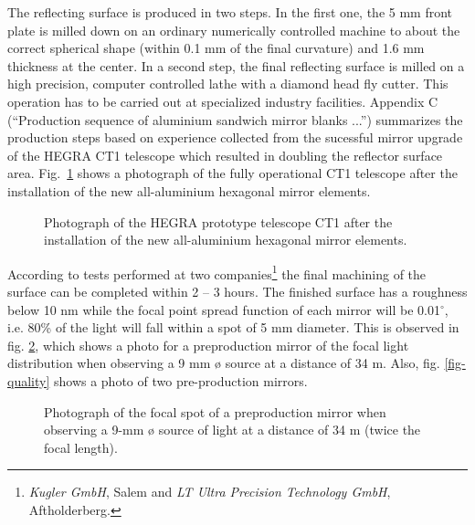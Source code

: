 The reflecting surface is produced in two steps. In the first one, the 5 mm
front plate is milled down on an ordinary numerically controlled machine
to about the correct spherical shape (within 0.1 mm of the final curvature)
and 1.6 mm thickness at the center. In a second step, the final reflecting
surface is milled on a high precision, computer controlled lathe with a
diamond head fly cutter. This operation has to be carried out at specialized
industry facilities. Appendix C (``Production sequence of aluminium sandwich mirror
blanks ...'') summarizes the production
steps based on experience collected from the sucessful mirror upgrade of the HEGRA CT1 
telescope which resulted in doubling the reflector surface area.
Fig.~\ref{fig-ct1} shows a photograph of the fully operational CT1 telescope after
the installation of the new all-aluminium hexagonal mirror elements. 
\begin{figure}[htb]
\leavevmode
\centering
\epsfxsize=14cm
\caption{Photograph of the HEGRA prototype telescope
CT1 after the installation of the new all-aluminium
hexagonal mirror elements.}
\label{fig-ct1}
\end{figure}


According to tests performed at two companies\footnote{{\it Kugler GmbH},
Salem and {\it LT Ultra Precision Technology GmbH}, Aftholderberg.} the
final machining of the surface can be completed within 2 -- 3 hours. The
finished surface has a roughness below 10 nm while the focal point spread function
of each mirror will be 0.01$^{\circ }$, i.e. 80\% of the light will fall
within a spot of 5 mm diameter. This is observed in fig. \ref{fig-focal},
which shows a photo for a preproduction mirror of the focal light
distribution when observing a 9 mm {\o} source at a distance of 34 m. Also,
fig. \ref{fig-quality} shows a photo of two pre-production mirrors.

\begin{figure}[htb]
\leavevmode
\centering
\epsfxsize=10cm
\caption{Photograph of the focal spot
of a preproduction mirror when observing a 9-mm {\o} source of light
at a distance of 34 m (twice the focal length).}
\label{fig-focal}
\end{figure}


